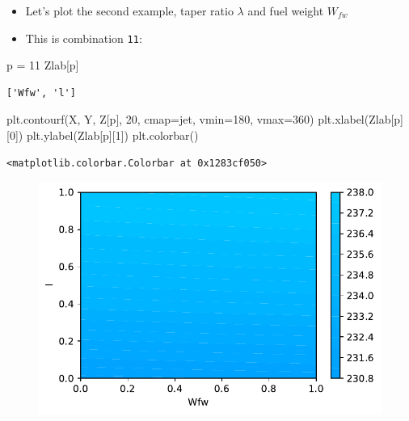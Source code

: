\documentclass[
  letterpaper,
  DIV=11,
  numbers=noendperiod]{scrreprt}
\newenvironment{Shaded}{\begin{snugshade}}{\end{snugshade}}
\newcommand{\DecValTok}[1]{\textcolor[rgb]{0.68,0.00,0.00}{#1}}
\newcommand{\NormalTok}[1]{\textcolor[rgb]{0.00,0.23,0.31}{#1}}
\newcommand{\OperatorTok}[1]{\textcolor[rgb]{0.37,0.37,0.37}{#1}}
\newcommand{\StringTok}[1]{\textcolor[rgb]{0.13,0.47,0.30}{#1}}
\providecommand{\tightlist}{%
  \setlength{\itemsep}{0pt}\setlength{\parskip}{0pt}}\usepackage{longtable,booktabs,array}
\begin{document}
\begin{itemize}
\tightlist
\item
  Let's plot the second example, taper ratio \(\lambda\) and fuel weight
  \(W_{fw}\)
\item
  This is combination \texttt{11}:
\end{itemize}

\begin{Shaded}
\begin{Highlighting}[]
\NormalTok{p }\OperatorTok{=} \DecValTok{11}
\NormalTok{Zlab[p]}
\end{Highlighting}
\end{Shaded}

\begin{verbatim}
['Wfw', 'l']
\end{verbatim}

\begin{Shaded}
\begin{Highlighting}[]
\NormalTok{plt.contourf(X, Y, Z[p], }\DecValTok{20}\NormalTok{, cmap}\OperatorTok{=}\StringTok{\textquotesingle{}jet\textquotesingle{}}\NormalTok{, vmin}\OperatorTok{=}\DecValTok{180}\NormalTok{, vmax}\OperatorTok{=}\DecValTok{360}\NormalTok{)}
\NormalTok{plt.xlabel(Zlab[p][}\DecValTok{0}\NormalTok{])}
\NormalTok{plt.ylabel(Zlab[p][}\DecValTok{1}\NormalTok{])}
\NormalTok{plt.colorbar()}
\end{Highlighting}
\end{Shaded}

\begin{verbatim}
<matplotlib.colorbar.Colorbar at 0x1283cf050>
\end{verbatim}

\begin{figure}[H]

{\centering \includegraphics{002_awwe_files/figure-pdf/cell-13-output-2.pdf}

}

\end{figure}
\end{document}

